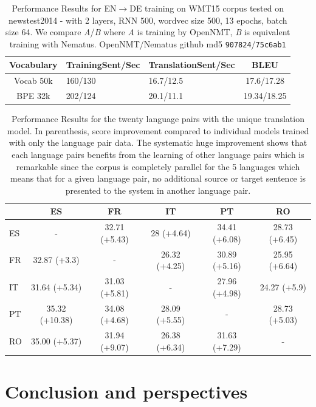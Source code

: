 \documentclass[11pt]{article}
\begin{document}
\begin{table}
 \small
  \centering
  \begin{tabular}{cp{10mm}p{10mm}c}
     Vocabulary & Training\newline Sent/Sec & Translation\newline Sent/Sec & BLEU \\
    \toprule
    Vocab 50k& 160/130 & 16.7/12.5 & 17.6/17.28\\
    \midrule
    BPE 32k& 202/124 & 20.1/11.1 & 19.34/18.25\\
    \bottomrule
  \end{tabular}
  \label{tab:res}
  \caption{Performance Results for EN$\rightarrow$DE training on WMT15 corpus tested on newstest2014 - with 2 layers, RNN 500, wordvec size 500, 13 epochs, batch size 64. We compare {\it A}/{\it B} where {\it A} is  training by OpenNMT, {\it B} is equivalent training with Nematus. OpenNMT/Nematus github md5 {\tt 907824}/{\tt 75c6ab1} }
\end{table}

\begin{table}
  \small \centering
  \begin{tabular}{lccccc}
    \toprule
          & ES & FR & IT & PT & RO \\
    \midrule
ES	& - & 32.71 (+5.43)	 & 28 (+4.64) & 34.41 (+6.08) & 28.73 (+6.45) \\ 
FR	& 32.87 (+3.3)	& -  & 26.32 (+4.25)	 & 30.89 (+5.16) & 25.95 (+6.64) \\
IT     & 31.64 (+5.34)	 & 31.03 (+5.81) & - & 27.96 (+4.98) & 24.27 (+5.9) \\
PT	& 35.32 (+10.38) & 34.08 (+4.68) & 28.09 (+5.55) & - & 28.73 (+5.03)\\
RO	& 35.00 (+5.37) & 31.94 (+9.07) & 26.38 (+6.34) & 31.63 (+7.29) & -\\
    \bottomrule
  \end{tabular}
  \label{tab:esfritptro}
  \caption{Performance Results for the twenty language pairs with the unique translation model. In parenthesis, score improvement compared to individual models trained with only the language pair data. The systematic huge improvement shows that each language pairs benefits from the learning of other language pairs which is remarkable since the corpus is completely parallel for the 5 languages which means that for a given language pair, no additional source or target sentence is presented to the system in another language pair.}
\end{table}


\section{Conclusion and perspectives}



\end{document}
